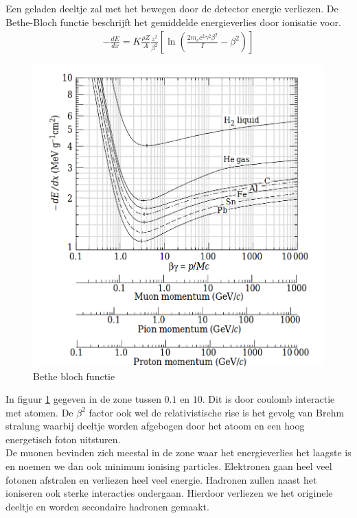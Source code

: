 \documentclass[../main.tex]{subfiles}
\begin{document}
Een geladen deeltje zal met het bewegen door de detector energie verliezen. De Bethe-Bloch functie beschrijft het gemiddelde energieverlies door ionisatie voor.
\begin{equation}
    \begin{aligned}
        \label{eq:bethe_bloch}
        -\frac{dE}{dx}=K\frac{\rho Z}{A}\frac{z^2}{\beta^2}\left[\ln\left(\frac{2m_ec^2\gamma^2\beta^2}{I}-\beta^2\right)\right]
    \end{aligned}
\end{equation}

\begin{figure}[h]
    \centering
    \includegraphics[width=0.8\linewidth]{introduction_and_review/bethe_bloch.png}
    \caption{Bethe bloch functie}%
    \label{fig:bethe_bloch}
\end{figure}
In figuur \ref{fig:bethe_bloch} gegeven in de zone tussen $0.1$ en $10$. Dit is door coulomb interactie met atomen. De $\beta^2$ factor ook wel de relativistische rise is het gevolg van Brehm stralung waarbij deeltje worden afgebogen door het atoom en een hoog energetisch foton uitsturen.\\
De muonen bevinden zich meestal in de zone waar het energieverlies het laagste is en noemen we dan ook minimum ionising particles. Elektronen gaan heel veel fotonen afstralen en verliezen heel veel energie. Hadronen zullen naast het ioniseren ook sterke interacties ondergaan. Hierdoor verliezen we het originele deeltje en worden secondaire hadronen gemaakt.
\end{document}
